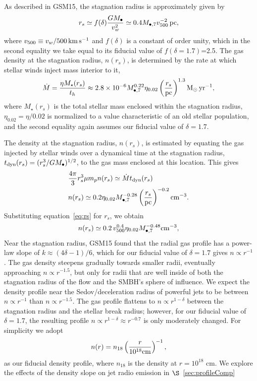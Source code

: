 \documentclass[usenatbib,fleqn]{mnras}
\newcommand{\Mbh}[1][]{M_{\bullet#1}}
\newcommand{\Msun}{{\rm M_\odot}}
\newcommand{\rs}{r_s}
\begin{document}
As described in GSM15, the stagnation radius is approximately given by
\begin{align}
r_s \simeq f(\delta) \frac{G M_{\bullet}}{v_w^2}
  \simeq 0.4 \Mbh[,7] v_{500}^{-2} \,{\rm pc},
\label{eq:rs}
\end{align}
%
where $v_{500}\equiv v_w/500 \,{\rm km\, s^{-1}}$ and $f(\delta)$ is a
constant of order unity, which in the second equality we take equal to
its fiducial value of $f(\delta = 1.7)$=2.5. The gas density at the
stagnation radius, $n(\rs)$, is determined by the rate at which
stellar winds inject mass interior to it,
\begin{equation}
  \dot{M}=\frac{\eta M_{\rm \star}(\rs)}{t_h} \approx  2.8 \times 10^{-6} \Mbh[,7]^{0.22} \eta_{0.02} \left(\frac{r_s}{\rm
      pc}\right)^{1.3} \Msun \, {\rm yr}^{-1},
\label{eq:dotM}
\end{equation}
%
where $M_{\star}(\rs)$ is the total stellar mass enclosed within the
stagnation radius, $\eta_{0.02}=\eta/0.02$ is normalized to a value
characteristic of an old stellar population, and the second equality
again assumes our fiducial value of $\delta=1.7$.

The density at the stagnation radius, $n(\rs)$, is estimated by
equating the gas injected by stellar winds over a dynamical time at
the stagnation radius, $t_{\rm dyn} (\rs)=(\rs^3/G \Mbh)^{1/2}$, to
the gas mass enclosed at this location.  This gives
\begin{align}
  &\frac{4 \pi}{3} \rs^3 \mu m_p n(r_s) \simeq \dot{M} t_{\rm dyn}
  (\rs) \nonumber\\
  & n(r_s) \simeq 0.2 \eta_{0.02} \Mbh[,7]^{-0.28}
  \left(\frac{r_s}{\rm pc}\right)^{-0.2} {\rm cm}^{-3}.
\label{eq:nrs}
\end{align}
%
Substituting equation~\eqref{eq:rs} for $r_s$, we obtain 
\begin{equation}
n(r_s) \simeq 0.2 \, v_{500}^{0.4} \eta_{0.02} \Mbh[,7]^{-0.48} {\rm cm}^{-3},
\label{eq:nrs2}
\end{equation}
%
Near the stagnation radius, GSM15 found that the radial gas profile
has a power-law slope of $k \approx (4\delta-1)/6$, which for our
fiducial value of $\delta=1.7$ gives $n \propto r^{-1}$. The gas
density steepens gradually towards smaller radii, eventually
approaching $n\propto r^{-1.5}$, but only for radii that are well
inside of both the stagnation radius of the flow and the SMBH's sphere
of influence. We expect the density profile near the
Sedov/deceleration radius of powerful jets to be between $n\propto
r^{-1}$ than $n\propto r^{-1.5}$. The gas profile flattens to
$n\propto r^{1-\delta}$ between the stagnation radius and the stellar
break radius; however, for our fiducial value of $\delta = 1.7$, the
resulting profile $n\propto r^{1-\delta} \approx r^{-0.7}$ is only
moderately changed. For simplicity we adopt
\begin{equation} n(r)= n_{18} \left(\frac{r}{10^{18}
    {\rm cm}}\right)^{-1},
\label{eq:profile}
\end{equation}
as our fiducial density profile, where $n_{18}$ is the density at $r =
10^{18}$ cm. We explore the effects of the density slope on jet radio
emission in $\S$~\ref{sec:profileComp}
\end{document}
